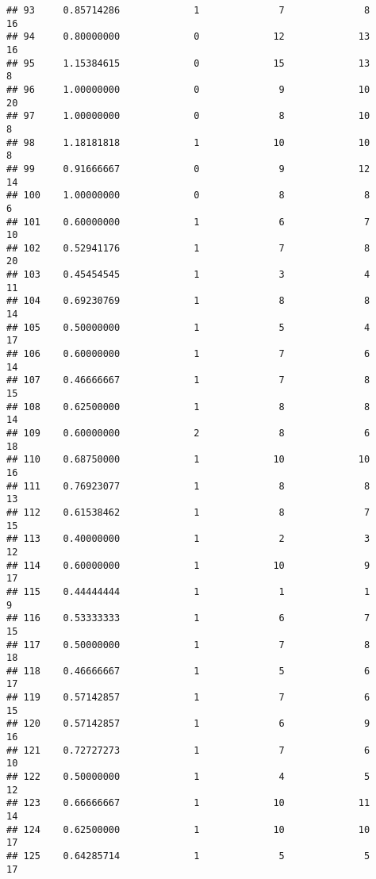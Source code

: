 \documentclass[
]{article}
\begin{document}
\begin{verbatim}
## 93     0.85714286             1              7              8             16
## 94     0.80000000             0             12             13             16
## 95     1.15384615             0             15             13              8
## 96     1.00000000             0              9             10             20
## 97     1.00000000             0              8             10              8
## 98     1.18181818             1             10             10              8
## 99     0.91666667             0              9             12             14
## 100    1.00000000             0              8              8              6
## 101    0.60000000             1              6              7             10
## 102    0.52941176             1              7              8             20
## 103    0.45454545             1              3              4             11
## 104    0.69230769             1              8              8             14
## 105    0.50000000             1              5              4             17
## 106    0.60000000             1              7              6             14
## 107    0.46666667             1              7              8             15
## 108    0.62500000             1              8              8             14
## 109    0.60000000             2              8              6             18
## 110    0.68750000             1             10             10             16
## 111    0.76923077             1              8              8             13
## 112    0.61538462             1              8              7             15
## 113    0.40000000             1              2              3             12
## 114    0.60000000             1             10              9             17
## 115    0.44444444             1              1              1              9
## 116    0.53333333             1              6              7             15
## 117    0.50000000             1              7              8             18
## 118    0.46666667             1              5              6             17
## 119    0.57142857             1              7              6             15
## 120    0.57142857             1              6              9             16
## 121    0.72727273             1              7              6             10
## 122    0.50000000             1              4              5             12
## 123    0.66666667             1             10             11             14
## 124    0.62500000             1             10             10             17
## 125    0.64285714             1              5              5             17

\end{verbatim}
\end{document}
